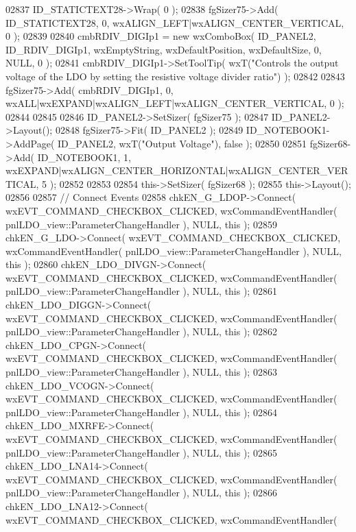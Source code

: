 \begin{DoxyCode}
02837     ID_STATICTEXT28->Wrap( 0 );
02838     fgSizer75->Add( ID_STATICTEXT28, 0, wxALIGN\_LEFT|wxALIGN\_CENTER\_VERTICAL, 0 );
02839     
02840     cmbRDIV_DIGIp1 = \textcolor{keyword}{new} wxComboBox( ID_PANEL2, ID_RDIV_DIGIp1, wxEmptyString, wxDefaultPosition, 
      wxDefaultSize, 0, NULL, 0 ); 
02841     cmbRDIV_DIGIp1->SetToolTip( wxT(\textcolor{stringliteral}{"Controls the output voltage of the LDO by setting the resistive
       voltage divider ratio"}) );
02842     
02843     fgSizer75->Add( cmbRDIV_DIGIp1, 0, wxALL|wxEXPAND|wxALIGN\_LEFT|wxALIGN\_CENTER\_VERTICAL, 0 );
02844     
02845     
02846     ID_PANEL2->SetSizer( fgSizer75 );
02847     ID_PANEL2->Layout();
02848     fgSizer75->Fit( ID_PANEL2 );
02849     ID_NOTEBOOK1->AddPage( ID_PANEL2, wxT(\textcolor{stringliteral}{"Output Voltage"}), \textcolor{keyword}{false} );
02850     
02851     fgSizer68->Add( ID_NOTEBOOK1, 1, wxEXPAND|wxALIGN\_CENTER\_HORIZONTAL|wxALIGN\_CENTER\_VERTICAL, 5 );
02852     
02853     
02854     this->SetSizer( fgSizer68 );
02855     this->Layout();
02856     
02857     \textcolor{comment}{// Connect Events}
02858     chkEN_G_LDOP->Connect( wxEVT\_COMMAND\_CHECKBOX\_CLICKED, wxCommandEventHandler( 
      pnlLDO_view::ParameterChangeHandler ), NULL, \textcolor{keyword}{this} );
02859     chkEN_G_LDO->Connect( wxEVT\_COMMAND\_CHECKBOX\_CLICKED, wxCommandEventHandler( 
      pnlLDO_view::ParameterChangeHandler ), NULL, \textcolor{keyword}{this} );
02860     chkEN_LDO_DIVGN->Connect( wxEVT\_COMMAND\_CHECKBOX\_CLICKED, wxCommandEventHandler( 
      pnlLDO_view::ParameterChangeHandler ), NULL, \textcolor{keyword}{this} );
02861     chkEN_LDO_DIGGN->Connect( wxEVT\_COMMAND\_CHECKBOX\_CLICKED, wxCommandEventHandler( 
      pnlLDO_view::ParameterChangeHandler ), NULL, \textcolor{keyword}{this} );
02862     chkEN_LDO_CPGN->Connect( wxEVT\_COMMAND\_CHECKBOX\_CLICKED, wxCommandEventHandler( 
      pnlLDO_view::ParameterChangeHandler ), NULL, \textcolor{keyword}{this} );
02863     chkEN_LDO_VCOGN->Connect( wxEVT\_COMMAND\_CHECKBOX\_CLICKED, wxCommandEventHandler( 
      pnlLDO_view::ParameterChangeHandler ), NULL, \textcolor{keyword}{this} );
02864     chkEN_LDO_MXRFE->Connect( wxEVT\_COMMAND\_CHECKBOX\_CLICKED, wxCommandEventHandler( 
      pnlLDO_view::ParameterChangeHandler ), NULL, \textcolor{keyword}{this} );
02865     chkEN_LDO_LNA14->Connect( wxEVT\_COMMAND\_CHECKBOX\_CLICKED, wxCommandEventHandler( 
      pnlLDO_view::ParameterChangeHandler ), NULL, \textcolor{keyword}{this} );
02866     chkEN_LDO_LNA12->Connect( wxEVT\_COMMAND\_CHECKBOX\_CLICKED, wxCommandEventHandler( 

\end{DoxyCode}
